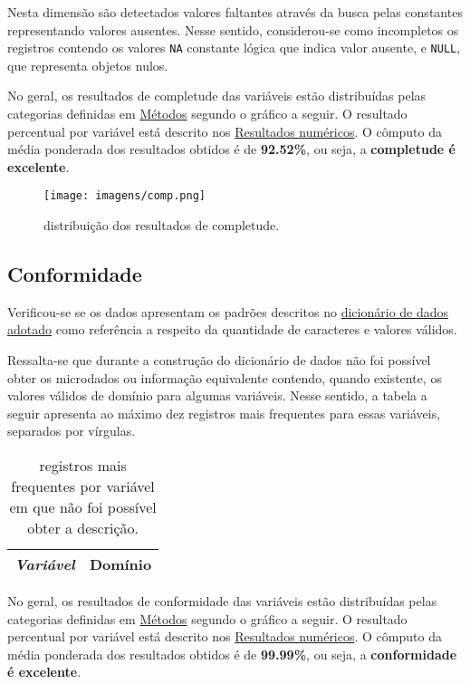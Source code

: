 \documentclass[
  12,
  table]{proadi}
\begin{document}
Nesta dimensão são detectados valores faltantes através da busca pelas
constantes representando valores ausentes. Nesse sentido, considerou-se
como incompletos os registros contendo os valores \texttt{NA} constante
lógica que indica valor ausente, e \texttt{NULL}, que representa objetos
nulos.

No geral, os resultados de completude das variáveis estão distribuídas
pelas categorias definidas em \protect\hyperlink{muxe9todos}{Métodos}
segundo o gráfico a seguir. O resultado percentual por variável está
descrito nos \protect\hyperlink{resultados-numuxe9ricos}{Resultados
numéricos}. O cômputo da média ponderada dos resultados obtidos é de
\textbf{92.52\%}, ou seja, a \textbf{completude é excelente}.

\begin{figure}
\centering
\texttt{[image: imagens/comp.png]}
\caption{distribuição dos resultados de completude.}
\end{figure}

\hypertarget{conformidade}{%
\subsection{Conformidade}\label{conformidade}}

Verificou-se se os dados apresentam os padrões descritos no
\protect\hyperlink{dicionuxe1rio-adotado}{dicionário de dados adotado}
como referência a respeito da quantidade de caracteres e valores
válidos.

Ressalta-se que durante a construção do dicionário de dados não foi
possível obter os microdados ou informação equivalente contendo, quando
existente, os valores válidos de domínio para algumas variáveis. Nesse
sentido, a tabela a seguir apresenta ao máximo dez registros mais
frequentes para essas variáveis, separados por vírgulas.

\begingroup\fontsize{10}{12}\selectfont

\begin{longtable}[t]{>{}l>{\raggedright\arraybackslash}p{10cm}}
\caption{\label{tab:unnamed-chunk-12}registros mais frequentes por variável em que não foi possível obter a descrição.}\\
\toprule
\em{Variável} & Domínio\\


\bottomrule
\end{longtable}
\endgroup{}

No geral, os resultados de conformidade das variáveis estão distribuídas
pelas categorias definidas em \protect\hyperlink{muxe9todos}{Métodos}
segundo o gráfico a seguir. O resultado percentual por variável está
descrito nos \protect\hyperlink{resultados-numuxe9ricos}{Resultados
numéricos}. O cômputo da média ponderada dos resultados obtidos é de
\textbf{99.99\%}, ou seja, a \textbf{conformidade é excelente}.
\end{document}
